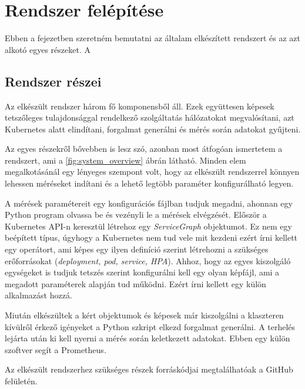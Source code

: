 \chapter{Rendszer felépítése}
\label{sec:system}
Ebben a fejezetben szeretném bemutatni az általam elkészített rendszert és az azt alkotó egyes részeket. A


\section{Rendszer részei}
Az elkészült rendszer három fő komponensből áll. Ezek együttesen képesek tetszőleges tulajdonsággal rendelkező szolgáltatás hálózatokat megvalósítani, azt Kubernetes alatt elindítani, forgalmat generálni és mérés során adatokat gyűjteni. 

Az egyes részekről bővebben is lesz szó, azonban most átfogóan ismertetem a rendszert, ami a \ref{fig:system_overview} ábrán látható. Minden elem megalkotásánál egy lényeges szempont volt, hogy az elkészült rendszerrel könnyen lehessen méréseket indítani és a lehető legtöbb paraméter konfigurálható legyen.

A mérések paramétereit egy konfigurációs fájlban tudjuk megadni, ahonnan egy Python program olvassa be és vezényli le a mérések elvégzését. Először a Kubernetes API-n keresztül létrehoz egy \textit{ServiceGraph} objektumot. Ez nem egy beépített típus, úgyhogy a Kubernetes nem tud vele mit kezdeni ezért írni kellett egy operátort, ami képes egy ilyen definíció szerint létrehozni a szükséges erőforrásokat (\textit{deployment, pod, service, HPA}). Ahhoz, hogy az egyes kiszolgáló egységeket is tudjuk tetszés szerint konfigurálni kell egy olyan képfájl, ami a megadott paraméterek alapján tud működni. Ezért írni kellett egy külön alkalmazást hozzá.

Miután elkészültek a kért objektumok és képesek már kiszolgálni a klaszteren kívülről érkező igényeket a Python szkript elkezd forgalmat generálni. A terhelés lejárta után ki kell nyerni a mérés során keletkezett adatokat. Ebben egy külön szoftver segít a Prometheus\citep{Prometheus}. 

Az elkészült rendszerhez szükséges részek forráskódjai megtalálhatóak a GitHub felületén\citep{gitRepo}. 

